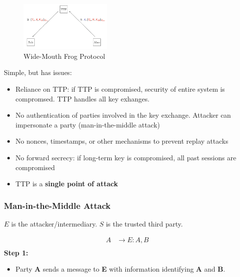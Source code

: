 \begin{figure}[h!]
    \centering
    \includegraphics[width=0.4\textwidth]{img/frog.png}
    \caption{Wide-Mouth Frog Protocol}
\end{figure}

Simple, but has issues:
\begin{itemize}
    \item Reliance on TTP: if TTP is compromised, security of entire system is compromsed. TTP handles all key exhanges.
    \item No authentication of parties involved in the key exchange. Attacker can impersonate a party (man-in-the-middle attack)
    \item No nonces, timestamps, or other mechanisms to prevent replay attacks
    \item No forward secrecy: if long-term key is compromised, all past sessions are compromised
    \item TTP is a \textbf{single point of attack}
\end{itemize}

\subsubsection{Man-in-the-Middle Attack}
$E$ is the attacker/intermediary. $S$ is the trusted third party.


\begin{align*}
    A &\rightarrow E: A, B \\
\end{align*}
\textbf{Step 1:} 
\begin{itemize}
    \item Party \textbf{A} sends a message to \textbf{E} with information identifying \textbf{A} and \textbf{B}.
\end{itemize}

